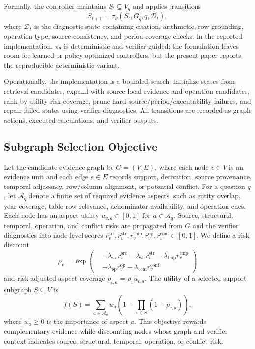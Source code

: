 \documentclass[letterpaper]{article}
\begin{document}
Formally, the controller maintains \(S_t\subseteq V_q\) and applies transitions
\[
S_{t+1} = \pi_\theta(S_t, G_q, q, \mathcal{D}_t),
\]
where \(\mathcal{D}_t\) is the diagnostic state containing citation, arithmetic, row-grounding, operation-type, source-consistency, and period-coverage checks.
In the reported implementation, \(\pi_\theta\) is deterministic and verifier-guided; the formulation leaves room for learned or policy-optimized controllers, but the present paper reports the reproducible deterministic variant.

Operationally, the implementation is a bounded search: initialize states from retrieval candidates, expand with source-local evidence and operation candidates, rank by utility-risk coverage, prune hard source/period/executability failures, and repair failed states using verifier diagnostics.
All transitions are recorded as graph actions, executed calculations, and verifier outputs.

\subsection{Subgraph Selection Objective}

Let the candidate evidence graph be \(G=(V,E)\), where each node \(v\in V\) is an evidence unit and each edge \(e\in E\) records support, derivation, source provenance, temporal adjacency, row/column alignment, or potential conflict.
For a question \(q\), let \(\mathcal{A}_q\) denote a finite set of required evidence aspects, such as entity overlap, year coverage, table-row relevance, denominator availability, and operation cues.
Each node has an aspect utility \(u_{v,a}\in[0,1]\) for \(a\in\mathcal{A}_q\).
Source, structural, temporal, operation, and conflict risks are propagated from \(G\) and the verifier diagnostics into node-level scores \(r^{\mathrm{src}}_v,r^{\mathrm{str}}_v,r^{\mathrm{tmp}}_v,r^{\mathrm{op}}_v,r^{\mathrm{conf}}_v\in[0,1]\).
We define a risk discount
\[
\rho_v=\exp\!\left(
\begin{aligned}
&-\lambda_{\mathrm{src}}r^{\mathrm{src}}_v
-\lambda_{\mathrm{str}}r^{\mathrm{str}}_v
-\lambda_{\mathrm{tmp}}r^{\mathrm{tmp}}_v\\
&-\lambda_{\mathrm{op}}r^{\mathrm{op}}_v
-\lambda_{\mathrm{conf}}r^{\mathrm{conf}}_v
\end{aligned}
\right)
\]
and risk-adjusted aspect coverage \(p_{v,a}=\rho_v u_{v,a}\).
The utility of a selected support subgraph \(S\subseteq V\) is
\[
f(S)=\sum_{a\in\mathcal{A}_q} w_a
\left(1-\prod_{v\in S}(1-p_{v,a})\right),
\]
where \(w_a\ge 0\) is the importance of aspect \(a\).
This objective rewards complementary evidence while discounting nodes whose graph and verifier context indicates source, structural, temporal, operation, or conflict risk.
\end{document}
